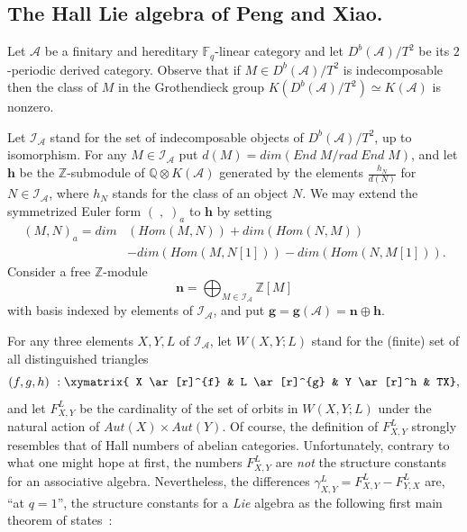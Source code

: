 \documentclass[a4paper,10pt]{amsart}
\def\Z{\mathbb{Z}}
\def\Q{\mathbb{Q}}
\def\A{\mathcal{A}}
\numberwithin{equation}{section}
\begin{document}
{\vspace{.2in}

\subsection{The Hall Lie algebra of Peng and Xiao.}

\vspace{.2in}

Let $\mathcal{A}$ be a finitary and hereditary $\mathbb{F}_q$-linear category and let $D^b(\mathcal{A})/T^2$ be its $2$-periodic derived category. Observe that if $M \in D^b(\mathcal{A})/T^2$ is indecomposable then the class of $M$ in the Grothendieck group $K(D^b(\A)/T^2) \simeq K(\A)$ is nonzero.

Let $\mathcal{I}_{\A}$ stand for the set of indecomposable objects of $D^b(\A)/T^2$, up to isomorphism. For any $M \in \mathcal{I}_{\A}$ put $d(M)=dim(End\;M/rad\;End\;M)$, and let $\mathbf{h}$ be the $\Z$-submodule of $\Q \otimes K(\A)$ generated by the elements $\frac{h_N}{d(N)}$ for $N \in \mathcal{I}_{\A}$, where $h_N$ stands for the class of an object $N$. We may extend the symmetrized Euler form $(\;,\;)_a$ to $\mathbf{h}$ by setting
\begin{equation*}
\begin{split}
(M,N)_a={dim}&({Hom}(M,N))+{dim}({Hom}(N,M))\\
&-{dim}({Hom}(M,N[1]))-{dim}({Hom}(N,M[1])).
\end{split}
\end{equation*}
Consider a free $\Z$-module
$$\mathbf{n}=\bigoplus_{M \in \mathcal{I}_\A} \Z[M]$$
with basis indexed by elements of $\mathcal{I}_{\A}$, and put $\mathbf{g}=\mathbf{g}(\A)=\mathbf{n}\oplus \mathbf{h}$.

\vspace{.1in}

For any three elements $X,Y,L$ of $\mathcal{I}_{\A}$, let $W(X,Y;L)$ stand for the (finite) set of all distinguished triangles
$$(f,g,h)~: \xymatrix{ X \ar[r]^{f} & L \ar[r]^{g} & Y \ar[r]^h & TX},$$
and let $F_{X,Y}^L$ be the cardinality of the set of orbits in $W(X,Y;L)$ under the natural action of $Aut(X) \times Aut(Y)$. Of course, the definition of $F_{X,Y}^L$ strongly resembles that of Hall numbers of abelian categories. Unfortunately, contrary to what one might hope at first, the numbers $F_{X,Y}^L$ are \textit{not} the structure constants for an associative algebra. Nevertheless, the differences $\gamma_{X,Y}^L=F_{X,Y}^L-F_{Y,X}^L$ are, ``at $q=1$'', the structure constants for a \textit{Lie} algebra as the following first main theorem of \cite{PX} states~:

}
\end{document}
